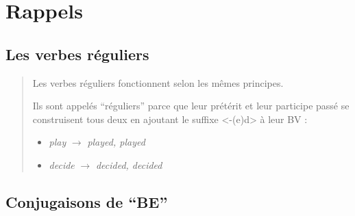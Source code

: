 \documentclass[
  10pt,
]{article}
\begin{document}
\hypertarget{rappels}{%
\section{Rappels}\label{rappels}}

\hypertarget{les-verbes-ruxe9guliers}{%
\subsection{Les verbes réguliers}\label{les-verbes-ruxe9guliers}}

\begin{quote}
Les verbes réguliers fonctionnent selon les mêmes principes.

Ils sont appelés ``réguliers'' parce que leur prétérit et leur participe passé se construisent tous deux en ajoutant le suffixe \textless-(e)d\textgreater{} à leur BV :

\begin{itemize}
\item
  \emph{play} \(\rightarrow\) \emph{played, played}
\item
  \emph{decide} \(\rightarrow\) \emph{decided, decided}
\end{itemize}
\end{quote}

\hypertarget{conjugaisons-de-be}{%
\subsection{Conjugaisons de ``BE''}\label{conjugaisons-de-be}}
\end{document}

